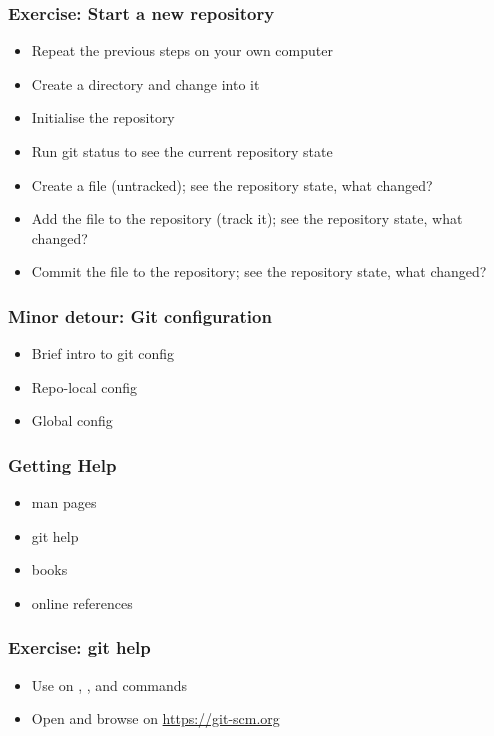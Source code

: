 \documentclass{git_course}
\begin{document}
\begin{frame}
\frametitle{Exercise: Start a new repository}
\begin{itemize}
    \item Repeat the previous steps on your own computer
    \item Create a directory and change into it
    \item Initialise the repository
    \item Run git status to see the current repository state
    \item Create a file (untracked); see the repository state, what changed?
    \item Add the file to the repository (track it); see the repository
        state, what changed?
    \item Commit the file to the repository; see the repository state, what
        changed?
\end{itemize}
\end{frame}

\begin{frame}
\frametitle{Minor detour: Git configuration}
\begin{itemize}
    \item Brief intro to git config
    \item Repo-local config
    \item Global config
\end{itemize}
\end{frame}

\begin{frame}
\frametitle{Getting Help}
\begin{itemize}
    \item man pages
    \item git help
    \item books
    \item online references
\end{itemize}
\end{frame}

\begin{frame}
\frametitle{Exercise: git help}
\begin{itemize}
    \item Use  on , ,  and
         commands
    \item Open and browse on \url{https://git-scm.org}
\end{itemize}
\end{frame}
\end{document}
